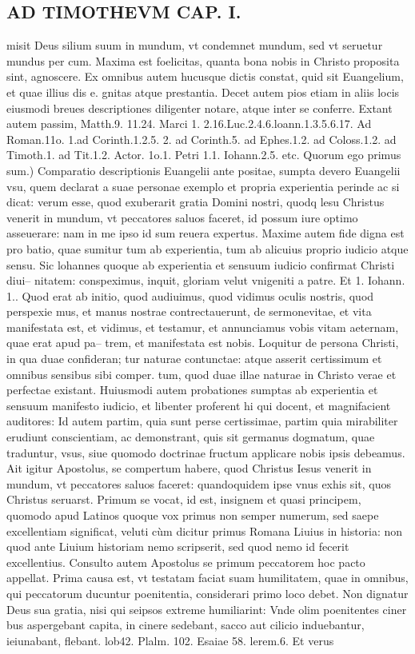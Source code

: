 \documentclass{article}
\begin{document}
\begin{pages}
\section*{AD TIMOTHEVM CAP. I. }
\marginpar{[ p.52 ]}\pstart misit Deus silium suum in mundum, vt condemnet mundum, sed vt seruetur mundus per cum. Maxima est foelicitas, quanta bona nobis in Christo proposita sint, agnoscere.  \pend\pstart Ex omnibus autem hucusque dictis constat, quid sit Euangelium, et quae illius dis e. gnitas atque prestantia. Decet autem pios etiam in aliis locis eiusmodi breues descriptiones diligenter notare, atque  inter se conferre. Extant autem passim, Matth.9. 11.24. Marci 1. 2.16.Luc.2.4.6.loann.1.3.5.6.17. Ad Roman.11o. 1.ad Corinth.1.2.5. 2. ad Corinth.5. ad Ephes.1.2. ad Coloss.1.2. ad Timoth.1. ad Tit.1.2. Actor. 1o.1. Petri 1.1. Iohann.2.5. etc.  \pend\pstart Quorum ego primus sum.) Comparatio descriptionis Euangelii ante positae, sumpta devero Euangelii vsu, quem declarat a suae personae exemplo et propria experientia perinde ac si dicat: verum esse, quod exuberarit gratia Domini nostri, quodq lesu Christus venerit in mundum, vt peccatores saluos faceret, id possum iure optimo asseuerare: nam in me ipso id sum reuera expertus. Maxime autem fide digna est pro batio, quae sumitur tum ab experientia, tum ab alicuius proprio iudicio atque sensu. Sic lohannes quoque ab experientia et sensuum iudicio confirmat Christi diui-- nitatem: conspeximus, inquit, gloriam velut vnigeniti a patre. Et 1. Iohann. 1.. Quod erat ab initio, quod audiuimus, quod vidimus oculis nostris, quod perspexie mus, et manus nostrae contrectauerunt, de sermonevitae, et vita manifestata est, et   vidimus, et testamur, et annunciamus vobis vitam aeternam, quae erat apud pa-- trem, et manifestata est nobis. Loquitur de persona Christi, in qua duae confideran; tur naturae contunctae: atque asserit certissimum et omnibus sensibus sibi comper. tum, quod duae illae naturae in Christo verae et perfectae existant. Huiusmodi autem probationes sumptas ab experientia et sensuum manifesto iudicio, et libenter proferent hi qui docent, et magnifacient auditores: Id autem partim, quia sunt perse certissimae, partim quia mirabiliter erudiunt conscientiam, ac demonstrant, quis sit germanus dogmatum, quae traduntur, vsus, siue quomodo doctrinae fructum applicare nobis ipsis debeamus. Ait igitur Apostolus, se compertum habere, quod Christus Iesus venerit in mundum, vt peccatores saluos faceret: quandoquidem ipse vnus exhis sit, quos Christus seruarst. Primum se vocat, id est, insignem et quasi principem, quomodo apud Latinos quoque vox primus non semper numerum, sed saepe excellentiam significat, veluti cùm dicitur primus Romana Liuius in historia: non quod ante Liuium historiam nemo scripserit, sed quod nemo id fecerit excellentius. Consulto autem Apostolus se primum peccatorem hoc pacto appellat. Prima causa est, vt testatam faciat suam humilitatem, quae in omnibus, qui peccatorum ducuntur poenitentia, considerari primo loco debet. Non dignatur Deus sua gratia, nisi qui seipsos extreme humiliarint: Vnde olim poenitentes ciner bus aspergebant capita, in cinere sedebant, sacco aut cilicio induebantur, ieiunabant, flebant. lob42. Plalm. 102. Esaiae 58. lerem.6. Et verus 
\end{pages}
\end{document}
